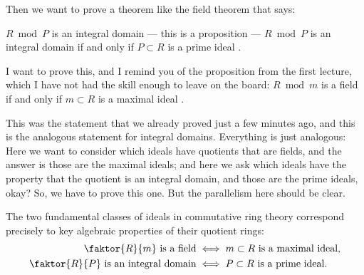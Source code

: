 \begin{speech}[00:53:20 - 00:54:40]
Then we want to prove a theorem like the field theorem that says: 

$R \bmod P$ is an integral domain --- this is a proposition --- $R \bmod P$ is an integral domain if and only if $P \subset R$ is a prime ideal .

I want to prove this, and I remind you of the proposition from the first lecture, which I have not had the skill enough to leave on the board: $R \bmod m$ is a field if and only if $m \subset R$ is a maximal ideal .

This was the statement that we already proved just a few minutes ago, and this is the analogous statement for integral domains. Everything is just analogous: Here we want to consider which ideals have quotients that are fields, and the answer is those are the maximal ideals; and here we ask which ideals have the property that the quotient is an integral domain, and those are the prime ideals, okay? So, we have to prove this one. But the parallelism here should be clear.
\end{speech}

\begin{content}
\end{content}

\begin{overview}
The two fundamental classes of ideals in commutative ring theory correspond precisely to key algebraic properties of their quotient rings:
\begin{align*}
\faktor{R}{m} \text{ is a field} &\iff m \subset R \text{ is a maximal ideal}, \\
\faktor{R}{P} \text{ is an integral domain} &\iff P \subset R \text{ is a prime ideal}.
\end{align*}
\end{overview}

